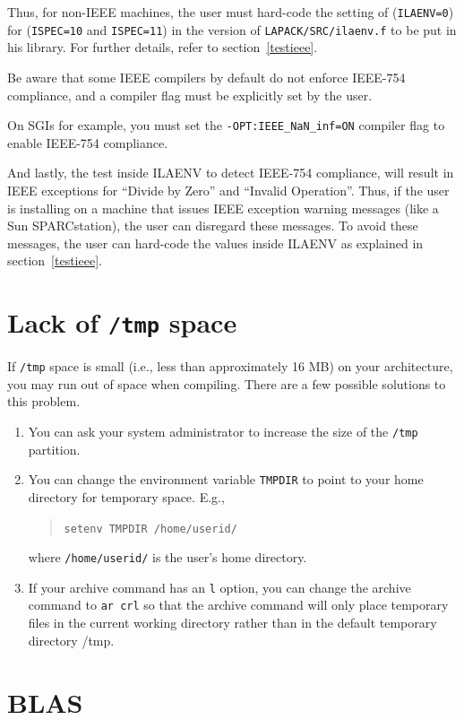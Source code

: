 \documentclass[11pt]{report}
\begin{document}
Thus, for non-IEEE machines, the user must hard-code the setting of
(\texttt{ILAENV=0}) for (\texttt{ISPEC=10} and \texttt{ISPEC=11}) in the version
of \texttt{LAPACK/SRC/ilaenv.f} to be put in
his library.  For further details, refer to section~\ref{testieee}.

Be aware
that some IEEE compilers by default do not enforce IEEE-754 compliance, and
a compiler flag must be explicitly set by the user.

On SGIs for example, you must set the \texttt{-OPT:IEEE\_NaN\_inf=ON} compiler
flag to enable IEEE-754 compliance.

And lastly, the test inside ILAENV to detect IEEE-754 compliance, will
result in IEEE exceptions for ``Divide by Zero'' and ``Invalid Operation''.
Thus, if the user is installing on a machine that issues IEEE exception
warning messages (like a Sun SPARCstation), the user can disregard these
messages.  To avoid these messages, the user can hard-code the values
inside ILAENV as explained in section~\ref{testieee}.

\section{Lack of \texttt{/tmp} space}

If \texttt{/tmp} space is small (i.e., less than approximately 16 MB) on your
architecture, you may run out of space
when compiling.  There are a few possible solutions to this problem.
\begin{enumerate}
\item You can ask your system administrator to increase the size of the
\texttt{/tmp} partition.
\item You can change the environment variable \texttt{TMPDIR} to point to
your home directory for temporary space.  E.g.,
\begin{quote}
\texttt{setenv TMPDIR /home/userid/}
\end{quote}
where \texttt{/home/userid/} is the user's home directory.
\item If your archive command has an \texttt{l} option, you can change the
archive command to \texttt{ar crl} so that the
archive command will only place temporary files in the current working
directory rather than in the default temporary directory /tmp.
\end{enumerate}

\section{BLAS}
\end{document}
